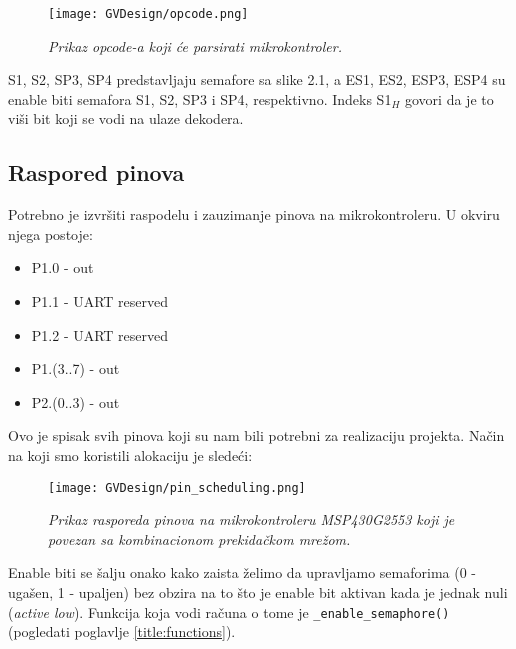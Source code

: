 \documentclass[a4paper,12pt, projekat]{etf}
\begin{document}
\begin{figure}[htb]
\centering
\texttt{[image: GVDesign/opcode.png]}
\caption{\emph{Prikaz opcode-a koji će parsirati mikrokontroler.}}
\label{fig:opcodepreview}
\end{figure}

\hfill \break

S1, S2, SP3, SP4 predstavljaju semafore sa slike 2.1, a ES1, ES2, ESP3, ESP4 su enable biti semafora S1, S2, SP3 i SP4, respektivno. Indeks S1$_{H}$ govori da je to viši bit koji se vodi na ulaze dekodera.
 
\subsection{Raspored pinova}
\label{title:micro_scheduling}
Potrebno je izvršiti raspodelu i zauzimanje pinova na mikrokontroleru. U okviru njega postoje:
\begin{itemize}
  \item P1.0 - out
  \item P1.1 - UART reserved
  \item P1.2 - UART reserved
  \item P1.(3..7) - out
  \item P2.(0..3) - out
\end{itemize}
Ovo je spisak svih pinova koji su nam bili potrebni za realizaciju projekta. Način na koji smo koristili alokaciju je sledeći:

\begin{figure}[!htb]
\centering
\texttt{[image: GVDesign/pin\_scheduling.png]}
\begin{center}
\caption{\emph{Prikaz rasporeda pinova na mikrokontroleru MSP430G2553 koji je povezan sa kombinacionom prekidačkom mrežom.}}
\end{center}
\label{figure:micro_scheduling}
\end{figure}
\hfill \break \break
Enable biti se šalju onako kako zaista želimo da upravljamo semaforima (0 - ugašen, 1 - upaljen) bez obzira na to što je enable bit aktivan kada je jednak nuli (\textit{active low}). Funkcija koja vodi računa o tome je \verb|_enable_semaphore()| (pogledati poglavlje \ref{title:functions}).
\end{document}
